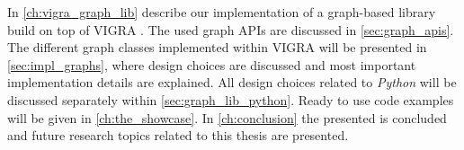 In \cref{ch:vigra_graph_lib} describe our implementation of
a graph-based library build on top of VIGRA \cite{koethe_2000_phd_thesis,software_vigra}. 
The used graph APIs are discussed in \cref{sec:graph_apis}.
The different graph classes implemented within VIGRA
will be presented in \cref{sec:impl_graphs}, where
design choices are discussed and most 
important implementation details are explained.
All design choices related to \emph{Python} will
be discussed separately within \cref{sec:graph_lib_python}.
Ready to use code examples will be given in \cref{ch:the_showcase}.
In \cref{ch:conclusion} the presented is concluded
and future research topics related to this thesis are presented.




